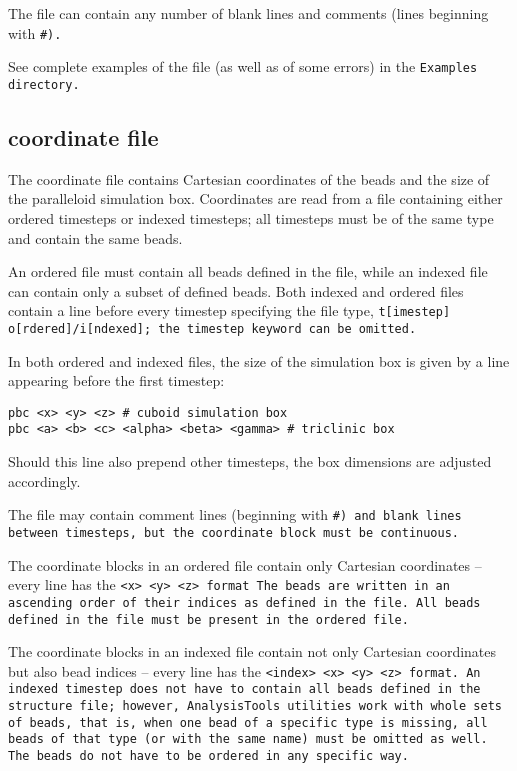 The \vsf file can contain any number of blank lines and comments (lines
beginning with \tt{\#}).

See complete examples of the \vsf file (as well as of some errors) in the
\tt{Examples} directory.

\subsection{\vcf coordinate file} \label{ssec:CoordinateVcf}

The coordinate file contains Cartesian coordinates of the beads and the
size of the paralleloid simulation box. Coordinates are read from a \vcf
file containing either ordered timesteps or indexed timesteps; all
timesteps must be of the same type and contain the same beads.

An ordered \vcf file must contain all beads defined in the \vsf file, while
an indexed \vcf file can contain only a subset of defined beads. Both
indexed and ordered \vcf files contain a line before every timestep
specifying the file type, \tt{t[imestep] o[rdered]/i[ndexed]}; the
\tt{timestep} keyword can be omitted.

In both ordered and indexed \vcf files, the size of the simulation box is
given by a line appearing before the first timestep:
%
\begin{lstlisting}
pbc <x> <y> <z> # cuboid simulation box
pbc <a> <b> <c> <alpha> <beta> <gamma> # triclinic box
\end{lstlisting}
%
Should this line also prepend other timesteps, the box dimensions are
adjusted accordingly.

The \vcf file may contain comment lines (beginning with
\tt{\#}) and blank lines between timesteps, but the coordinate block
must be continuous.

The coordinate blocks in an ordered \vcf file contain only Cartesian
coordinates -- every line has the \tt{<x> <y> <z>} format The beads are
written in an ascending order of their indices as defined in the \vsf file.
All beads defined in the \vsf file must be present in the ordered \vcf
file.

The coordinate blocks in an indexed \vcf file contain not only Cartesian
coordinates but also bead indices -- every line has the \tt{<index> <x> <y>
<z>} format. An indexed timestep does not have to contain all beads defined
in the \vsf structure file; however, \tt{AnalysisTools} utilities work with
whole sets of beads, that is, when one bead of a specific type is missing,
all beads of that type (or with the same name) must be omitted as well.
The beads do not have to be ordered in any specific way.

